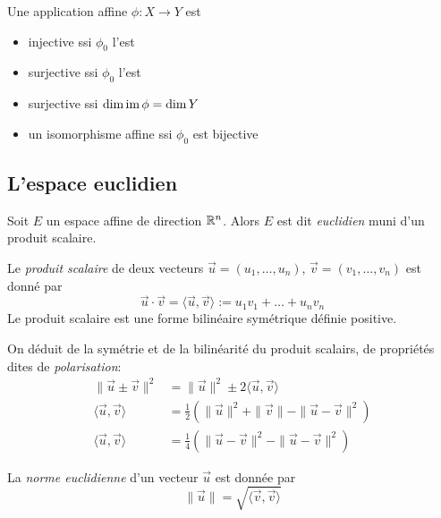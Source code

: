 \begin{corollary}
	Une application affine $\phi:X\to Y$ est
	\begin{itemize}
		\item injective ssi $\phi_0$ l'est
		\item surjective ssi $\phi_0$ l'est
		\item surjective ssi $\dim \operatorname{im} \phi = \dim Y$
		\item un isomorphisme affine ssi $\phi_0$ est bijective
	\end{itemize}
\end{corollary}

\subsection{L'espace euclidien}

\begin{definition}
	Soit $E$ un espace affine de direction $\mathbb{R}^n$. Alors $E$ est dit
	\emph{euclidien} muni d'un produit scalaire.
\end{definition}

\begin{definition}
	Le \emph{produit scalaire} de deux vecteurs $\vec{u} = (u_1, \dots, u_n)$,
	$\vec{v} = (v_1, \dots, v_n)$ est donné par
	\begin{equation*}
		\vec{u} \cdot \vec{v} = \langle \vec{u}, \vec{v} \rangle := 
		u_1v_1 + \dots + u_nv_n
	\end{equation*}
	Le produit scalaire est une forme bilinéaire symétrique définie positive.
\end{definition}

\begin{proposition}
	On déduit de la symétrie et de la bilinéarité du produit scalairs, de
	propriétés dites de \emph{polarisation}:
	\begin{align*}
		\|\vec{u} \pm \vec{v}\|^2 &= \|\vec{u}\|^2 \pm 2 \langle \vec{u},
		\vec{v} \rangle \\
		\langle \vec{u}, \vec{v} \rangle &= \frac{1}{2}(\|\vec{u}\|^2 +
			\|\vec{v}\| - \|\vec{u} - \vec{v}\|^2) \\
		\langle \vec{u}, \vec{v} \rangle &= \frac{1}{4}(\|\vec{u} -
			\vec{v}\|^2 - \|\vec{u} - \vec{v}\|^2)
	\end{align*}
\end{proposition}

\begin{definition}
	La \emph{norme euclidienne} d'un vecteur $\vec{u}$ est donnée
	par 
	\begin{equation*}
		\|\vec{u}\| = \sqrt{\langle \vec{v}, \vec{v} \rangle}
	\end{equation*}
\end{definition}

